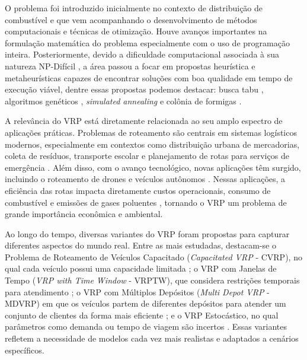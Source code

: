 O problema foi introduzido inicialmente no contexto de distribuição de combustível \cite{dantzig1959truck} e que vem acompanhando o desenvolvimento de métodos computacionais e técnicas de otimização. Houve avanços importantes na formulação matemática do problema especialmente com o uso de programação inteira. Posteriormente, devido a dificuldade computacional associada à sua natureza NP-Difícil \cite{hochba1997approximation}, a área passou a focar em propostas heurística e metaheurísticas capazes de encontrar soluções com boa qualidade em tempo de execução viável, dentre essas propostas podemos destacar: busca tabu \cite{glover1989tabu, glover1990tabu}, algoritmos genéticos \cite{boldberg1989genetic}, \textit{simulated annealing} \cite{kirkpatrick1983optimization} e colônia de formigas \cite{dorigo2002ant}. 

A relevância do VRP está diretamente relacionada ao seu amplo espectro de aplicações práticas. Problemas de roteamento são centrais em sistemas logísticos modernos, especialmente em contextos como distribuição urbana de mercadorias, coleta de resíduos, transporte escolar e planejamento de rotas para serviços de emergência \cite{golden2008vehicle,toth2002vehicle}. Além disso, com o avanço tecnológico, novas aplicações têm surgido, incluindo o roteamento de drones e veículos autônomos \cite{otto2018optimization}. Nessas aplicações, a eficiência das rotas impacta diretamente custos operacionais, consumo de combustível e emissões de gases poluentes \cite{lin2014survey}, tornando o VRP um problema de grande importância econômica e ambiental.

Ao longo do tempo, diversas variantes do VRP foram propostas para capturar diferentes aspectos do mundo real. Entre as mais estudadas, destacam-se o Problema de Roteamento de Veículos Capacitado (\textit{Capacitated VRP} - CVRP), no qual cada veículo possui uma capacidade limitada  \cite{solomon1987algorithms, xiao2012development}; o VRP com Janelas de Tempo (\textit{VRP with Time Window} - VRPTW), que considera restrições temporais para atendimento \cite{christofides1979vehicle, gambardella1999macs}; o VRP com Múltiplos Depósitos (\textit{Multi Depot VRP} - MDVRP) em que os veículos partem de diferentes depósitos para atender um conjunto de clientes da forma mais eficiente \cite{alinaghian2018multi}; e o VRP Estocástico, no qual parâmetros como demanda ou tempo de viagem são incertos \cite{renaud1996tabu, gendreau1996stochastic}. Essas variantes refletem a necessidade de modelos cada vez mais realistas e adaptados a cenários específicos.

